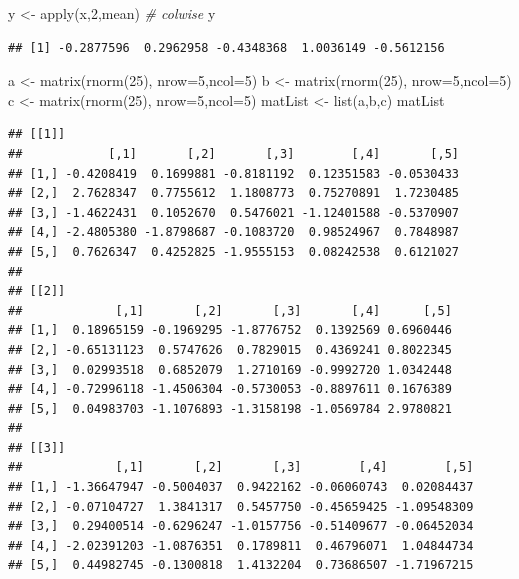 \documentclass[]{article}
\newenvironment{Shaded}{\begin{snugshade}}{\end{snugshade}}
\newcommand{\AttributeTok}[1]{\textcolor[rgb]{0.77,0.63,0.00}{#1}}
\newcommand{\CommentTok}[1]{\textcolor[rgb]{0.56,0.35,0.01}{\textit{#1}}}
\newcommand{\DecValTok}[1]{\textcolor[rgb]{0.00,0.00,0.81}{#1}}
\newcommand{\FunctionTok}[1]{\textcolor[rgb]{0.00,0.00,0.00}{#1}}
\newcommand{\NormalTok}[1]{#1}
\newcommand{\OtherTok}[1]{\textcolor[rgb]{0.56,0.35,0.01}{#1}}
\begin{document}
\begin{Shaded}
\begin{Highlighting}[]
\NormalTok{y }\OtherTok{\textless{}{-}} \FunctionTok{apply}\NormalTok{(x,}\DecValTok{2}\NormalTok{,mean) }\CommentTok{\# colwise}
\NormalTok{y}
\end{Highlighting}
\end{Shaded}

\begin{verbatim}
## [1] -0.2877596  0.2962958 -0.4348368  1.0036149 -0.5612156
\end{verbatim}

\begin{Shaded}
\begin{Highlighting}[]
\NormalTok{a }\OtherTok{\textless{}{-}} \FunctionTok{matrix}\NormalTok{(}\FunctionTok{rnorm}\NormalTok{(}\DecValTok{25}\NormalTok{), }\AttributeTok{nrow=}\DecValTok{5}\NormalTok{,}\AttributeTok{ncol=}\DecValTok{5}\NormalTok{)}
\NormalTok{b }\OtherTok{\textless{}{-}} \FunctionTok{matrix}\NormalTok{(}\FunctionTok{rnorm}\NormalTok{(}\DecValTok{25}\NormalTok{), }\AttributeTok{nrow=}\DecValTok{5}\NormalTok{,}\AttributeTok{ncol=}\DecValTok{5}\NormalTok{)}
\NormalTok{c }\OtherTok{\textless{}{-}} \FunctionTok{matrix}\NormalTok{(}\FunctionTok{rnorm}\NormalTok{(}\DecValTok{25}\NormalTok{), }\AttributeTok{nrow=}\DecValTok{5}\NormalTok{,}\AttributeTok{ncol=}\DecValTok{5}\NormalTok{)}
\NormalTok{matList }\OtherTok{\textless{}{-}} \FunctionTok{list}\NormalTok{(a,b,c)}
\NormalTok{matList}
\end{Highlighting}
\end{Shaded}

\begin{verbatim}
## [[1]]
##            [,1]       [,2]       [,3]        [,4]       [,5]
## [1,] -0.4208419  0.1699881 -0.8181192  0.12351583 -0.0530433
## [2,]  2.7628347  0.7755612  1.1808773  0.75270891  1.7230485
## [3,] -1.4622431  0.1052670  0.5476021 -1.12401588 -0.5370907
## [4,] -2.4805380 -1.8798687 -0.1083720  0.98524967  0.7848987
## [5,]  0.7626347  0.4252825 -1.9555153  0.08242538  0.6121027
## 
## [[2]]
##             [,1]       [,2]       [,3]       [,4]      [,5]
## [1,]  0.18965159 -0.1969295 -1.8776752  0.1392569 0.6960446
## [2,] -0.65131123  0.5747626  0.7829015  0.4369241 0.8022345
## [3,]  0.02993518  0.6852079  1.2710169 -0.9992720 1.0342448
## [4,] -0.72996118 -1.4506304 -0.5730053 -0.8897611 0.1676389
## [5,]  0.04983703 -1.1076893 -1.3158198 -1.0569784 2.9780821
## 
## [[3]]
##             [,1]       [,2]       [,3]        [,4]        [,5]
## [1,] -1.36647947 -0.5004037  0.9422162 -0.06060743  0.02084437
## [2,] -0.07104727  1.3841317  0.5457750 -0.45659425 -1.09548309
## [3,]  0.29400514 -0.6296247 -1.0157756 -0.51409677 -0.06452034
## [4,] -2.02391203 -1.0876351  0.1789811  0.46796071  1.04844734
## [5,]  0.44982745 -0.1300818  1.4132204  0.73686507 -1.71967215
\end{verbatim}
\end{document}
